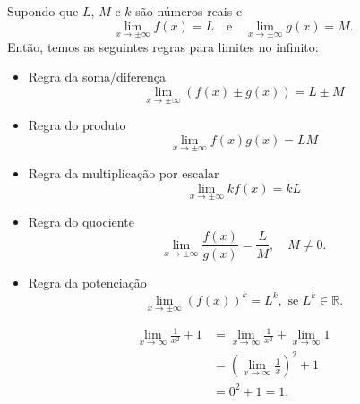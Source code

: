 \begin{obs}\label{obs:lim_regras_xinf}
Supondo que $L$, $M$ e $k$ são números reais e
\begin{equation}
  \lim_{x\to \pm\infty} f(x) = L\quad\text{e}\quad\lim_{x\to\pm\infty}g(x) = M.
\end{equation}
Então, temos as seguintes regras para limites no infinito:
\begin{itemize}
\item Regra da soma/diferença
  \begin{equation}
    \lim_{x\to\pm\infty} (f(x)\pm g(x)) = L\pm M
  \end{equation}
\item Regra do produto
  \begin{equation}
    \lim_{x\to\pm\infty} f(x)g(x) = LM
  \end{equation}
\item Regra da multiplicação por escalar
  \begin{equation}
    \lim_{x\to\pm\infty} kf(x) = kL
  \end{equation}
\item Regra do quociente
  \begin{equation}
    \lim_{x\to\pm\infty} \frac{f(x)}{g(x)} = \frac{L}{M},\quad M\neq 0.
  \end{equation}
\item Regra da potenciação
  \begin{equation}
    \lim_{x\to\pm\infty} (f(x))^k = L^k,\text{ se } L^k\in\mathbb{R}.
  \end{equation}
\end{itemize}
\end{obs}

\begin{ex}
  \begin{align}
    \lim_{x\to \infty} \frac{1}{x^2}+1 &= \lim_{x\to \infty} \frac{1}{x^2} + \lim_{x\to \infty}1 \\
                                       &= \left(\lim_{x\to\infty} \frac{1}{x}\right)^2 + 1\\
                                       &= 0^2 + 1 = 1.
\end{align}
\end{ex}

